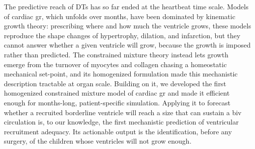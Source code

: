 
The predictive reach of DTs has so far ended at the heartbeat time scale. Models of cardiac \gls*{gr}, which unfolds over months, have been dominated by kinematic growth theory\cite{rodriguez94}: prescribing where and how much the ventricle grows, these models reproduce the shape changes of hypertrophy, dilation, and infarction\cite{goktepe10,costabal19,saez15}, but they cannot answer whether a given ventricle will grow, because the growth is imposed rather than predicted. The constrained mixture theory\cite{humphrey02a} instead lets growth emerge from the turnover of myocytes and collagen chasing a homeostatic mechanical set-point, and its homogenized formulation\cite{cyron16,braeu16} made this mechanistic description tractable at organ scale. Building on it, we developed the first homogenized constrained mixture model of cardiac \gls*{gr}\cite{gebauer23} and made it efficient enough for months-long, patient-specific simulation\cite{gebauer24}. Applying it to forecast whether a recruited borderline ventricle will reach a size that can sustain a \gls*{biv} circulation is, to our knowledge, the first mechanistic prediction of ventricular recruitment adequacy. Its actionable output is the identification, before any surgery, of the children whose ventricles will not grow enough.

